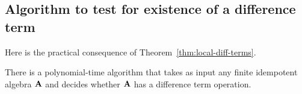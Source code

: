 \subsection{Algorithm to test for existence of a difference term}
\label{sec:algor-1}
Here is the practical consequence of Theorem~\ref{thm:local-diff-terms}.
\begin{corollary}
  \label{cor:algor-1}
  There is a polynomial-time algorithm that takes as input
  any finite idempotent algebra $\mathbf{A} $ and decides whether
  $\mathbf{A} $ has a difference term operation.
\end{corollary}
